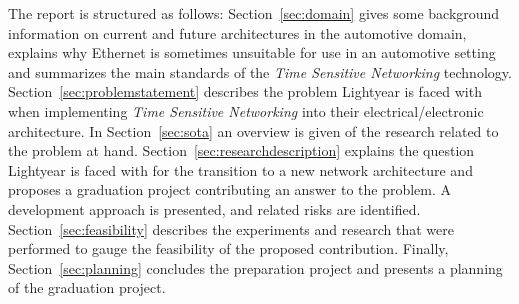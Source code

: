 The report is structured as follows: Section~\ref{sec:domain} gives some background information on current and future architectures in the automotive domain, explains why Ethernet is sometimes unsuitable for use in an automotive setting and summarizes the main standards of the \textit{Time Sensitive Networking} technology. Section~\ref{sec:problemstatement} describes the problem Lightyear is faced with when implementing \textit{Time Sensitive Networking} into their electrical/electronic architecture. In Section~\ref{sec:sota} an overview is given of the research related to the problem at hand. Section~\ref{sec:researchdescription} explains the question Lightyear is faced with for the transition to a new network architecture and proposes a graduation project contributing an answer to the problem. A development approach is presented, and related risks are identified. Section~\ref{sec:feasibility} describes the experiments and research that were performed to gauge the feasibility of the proposed contribution. Finally, Section~\ref{sec:planning} concludes the preparation project and presents a planning of the graduation project.